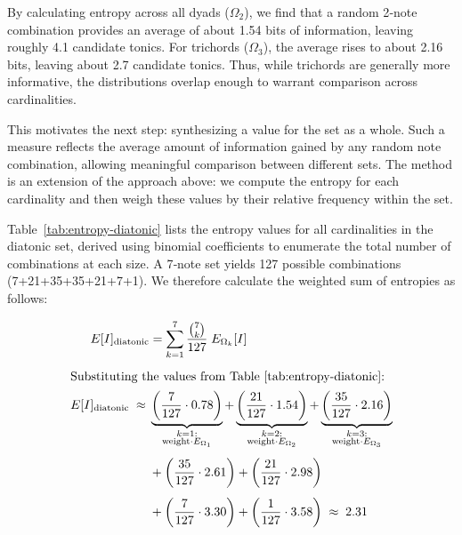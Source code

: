 \documentclass[10pt,twocolumn]{article}
\numberwithin{equation}{section} %
\begin{document}
    By calculating entropy across all dyads ($\Omega_2$), we find that a random 2‑note combination provides an average of about 1.54 bits of information, leaving roughly 4.1 candidate tonics.
    For trichords ($\Omega_3$), the average rises to about 2.16 bits, leaving about 2.7 candidate tonics.
    Thus, while trichords are generally more informative, the distributions overlap enough to warrant comparison across cardinalities.

    This motivates the next step: synthesizing a value for the set as a whole.
    Such a measure reflects the average amount of information gained by any random note combination, allowing meaningful comparison between different sets.
    The method is an extension of the approach above: we compute the entropy for each cardinality and then weigh these values by their relative frequency within the set.

    Table~\ref{tab:entropy-diatonic} lists the entropy values for all cardinalities in the diatonic set, derived using binomial coefficients to enumerate the total number of combinations at each size.
    A 7‑note set yields 127 possible combinations (7+21+35+35+21+7+1).
    We therefore calculate the weighted sum of entropies as follows:

    \begin{align}
        E[I]_{\text{diatonic}} &= \sum_{k=1}^{7} \frac{\binom{7}{k}}{127} \; E_{\Omega_k}[I]
        \label{eq:diatonic-avg} \\[4pt]
        \intertext{Substituting the values from Table~\ref{tab:entropy-diatonic}:}
        E[I]_{\text{diatonic}} \;\approx\; &
        \underbrace{\left( \frac{7}{127} \cdot 0.78 \right)}_{\substack{k=1:\\ \text{weight}\cdot E_{\Omega_1}}} +
        \underbrace{\left( \frac{21}{127} \cdot 1.54 \right)}_{\substack{k=2:\\ \text{weight}\cdot E_{\Omega_2}}} +
        \underbrace{\left( \frac{35}{127} \cdot 2.16 \right)}_{\substack{k=3:\\ \text{weight}\cdot E_{\Omega_3}}}
        \notag \\[4pt]
        &+ \left( \frac{35}{127} \cdot 2.61 \right) +
        \left( \frac{21}{127} \cdot 2.98 \right)
        \notag \\[4pt]
        &+ \left( \frac{7}{127} \cdot 3.30 \right) +
        \left( \frac{1}{127} \cdot 3.58 \right)
        \;\approx\; 2.31
        \label{eq:diatonic-sub}
    \end{align}
\end{document}
